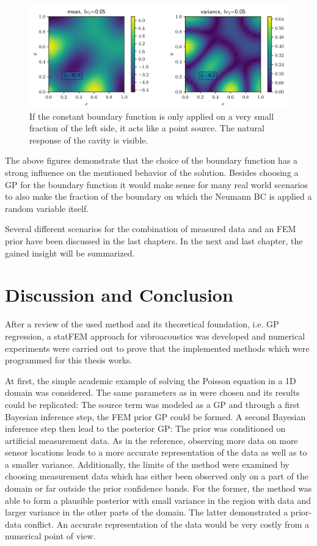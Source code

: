 \documentclass[%
  a4paper,oneside,%
  11pt,%
  smallchapters,
  style=printdev,
  extramargin,
  green,%
  rgb, <cmyk>
  ]{tubsbook}
\begin{document}
\begin{figure}[!ht]
\includegraphics[width=1\textwidth]{../../Python/Results/2D/VaryingSource/y_005/MeanVar.pdf}
\centering
\caption{If the constant boundary function is only applied on a very small fraction of the left side, it acts like a point source. The natural response of the cavity is visible. }
\label{fig:varFieldPriorFlat005}
\end{figure}

The above figures demonstrate that the choice of the boundary function has a strong influence on the mentioned behavior of the solution. Besides choosing a GP for the boundary function it would make sense for many real world scenarios to also make the fraction of the boundary on which the Neumann BC is applied a random variable itself.


\FloatBarrier

Several different scenarios for the combination of measured data and an FEM prior have been discussed in the last chapters. In the next and last chapter, the gained insight will be summarized.


\chapter{Discussion and Conclusion}
After a review of the used method and its theoretical foundation, i.e. GP regression, a statFEM approach for vibroacoustics was developed and numerical experiments were carried out to prove that the implemented methods which were programmed for this thesis works. 

At first, the simple academic example of solving the Poisson equation in a 1D domain was considered. The same parameters as in \cite{girolami2021} were chosen and its results could be replicated: The source term was modeled as a GP and through a first Bayesian inference step, the FEM prior GP could be formed. A second Bayesian inference step then lead to the posterior GP: The prior was conditioned on artificial measurement data. As in the reference, observing more data on more sensor locations leads to a more accurate representation of the data as well as to a smaller variance. Additionally, the limits of the method were examined by choosing measurement data which has either been observed only on a part of the domain or far outside the prior confidence bands. For the former, the method was able to form a plausible posterior with small variance in the region with data and larger variance in the other parts of the domain. The latter demonstrated a prior-data conflict. An accurate representation of the data would be very costly from a numerical point of view.
\end{document}
